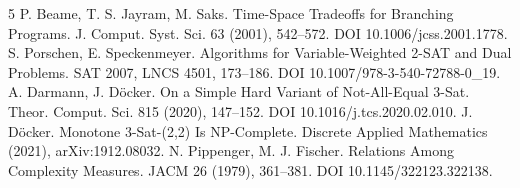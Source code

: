 \documentclass[11pt]{article}
\begin{document}
\begin{thebibliography}{5}
 P. Beame, T. S. Jayram, M. Saks. Time-Space Tradeoffs for Branching Programs. J. Comput. Syst. Sci. 63 (2001), 542--572. DOI 10.1006/jcss.2001.1778.
 S. Porschen, E. Speckenmeyer. Algorithms for Variable-Weighted 2-SAT and Dual Problems. SAT 2007, LNCS 4501, 173--186. DOI 10.1007/978-3-540-72788-0\_19.
 A. Darmann, J. D\"ocker. On a Simple Hard Variant of Not-All-Equal 3-Sat. Theor. Comput. Sci. 815 (2020), 147--152. DOI 10.1016/j.tcs.2020.02.010.
 J. D\"ocker. Monotone 3-Sat-(2,2) Is NP-Complete. Discrete Applied Mathematics (2021), arXiv:1912.08032.
 N. Pippenger, M. J. Fischer. Relations Among Complexity Measures. JACM 26 (1979), 361--381. DOI 10.1145/322123.322138.
\end{thebibliography}
\end{document}
